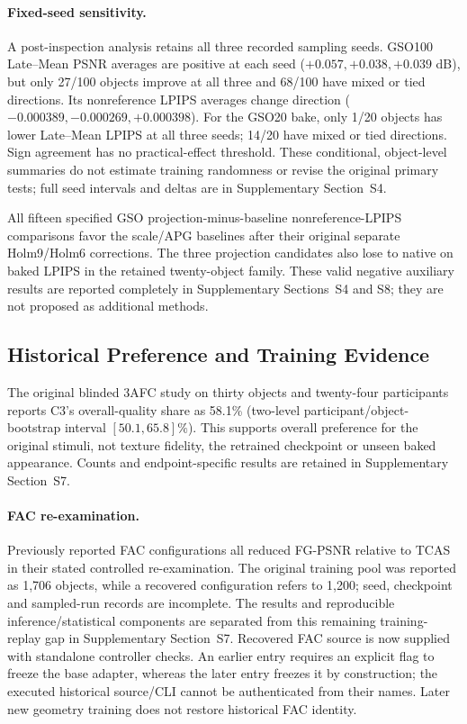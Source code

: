 \documentclass[times,twocolumn,final]{elsarticle}
\begin{document}
\paragraph{Fixed-seed sensitivity.}
A post-inspection analysis retains all three recorded sampling seeds. GSO100 Late--Mean PSNR averages are positive at each seed ($+0.057,+0.038,+0.039$ dB), but only 27/100 objects improve at all three and 68/100 have mixed or tied directions. Its nonreference LPIPS averages change direction ($-0.000389,-0.000269,+0.000398$). For the GSO20 bake, only 1/20 objects has lower Late--Mean LPIPS at all three seeds; 14/20 have mixed or tied directions. Sign agreement has no practical-effect threshold. These conditional, object-level summaries do not estimate training randomness or revise the original primary tests; full seed intervals and deltas are in Supplementary Section~S4.

All fifteen specified GSO projection-minus-baseline nonreference-LPIPS comparisons favor the scale/APG baselines after their original separate Holm9/Holm6 corrections. The three projection candidates also lose to native on baked LPIPS in the retained twenty-object family. These valid negative auxiliary results are reported completely in Supplementary Sections~S4 and S8; they are not proposed as additional methods.

\subsection{Historical Preference and Training Evidence}
\label{subsec:preference}
The original blinded 3AFC study on thirty objects and twenty-four participants reports C3's overall-quality share as 58.1\% (two-level participant/object-bootstrap interval $[50.1,65.8]\%$). This supports overall preference for the original stimuli, not texture fidelity, the retrained checkpoint or unseen baked appearance. Counts and endpoint-specific results are retained in Supplementary Section~S7.

\paragraph{FAC re-examination.}
\label{subsec:facreported}
Previously reported FAC configurations all reduced FG-PSNR relative to TCAS in their stated controlled re-examination. The original training pool was reported as 1,706 objects, while a recovered configuration refers to 1,200; seed, checkpoint and sampled-run records are incomplete. The results and reproducible inference/statistical components are separated from this remaining training-replay gap in Supplementary Section~S7. Recovered FAC source is now supplied with standalone controller checks. An earlier entry requires an explicit flag to freeze the base adapter, whereas the later entry freezes it by construction; the executed historical source/CLI cannot be authenticated from their names. Later new geometry training does not restore historical FAC identity.
\end{document}
